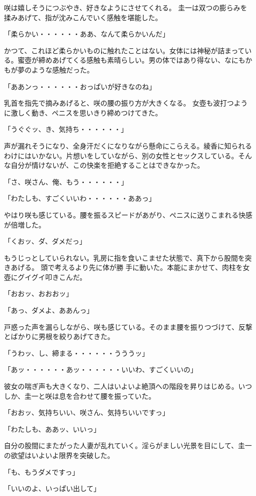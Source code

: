 ﻿\documentclass[book,tate]{jlreq}
\begin{document}
咲は嬉しそうにつぶやき、好きなようにさせてくれる。 圭一は双つの膨らみを揉みあげて、指が沈みこんでいく感触を堪能した。

「柔らかい・・・・・・ああ、なんて柔らかいんだ」

かつて、これほど柔らかいものに触れたことはない。女体には神秘が詰まっている。蜜壺が締めあげてくる感触も素晴らしい。男の体ではあり得ない、なにもかもが夢のような感触だった。

「ああンっ・・・・・・おっぱいが好きなのね」

乳首を指先で摘みあげると、咲の腰の振り方が大きくなる。 女壺も波打つように激しく動き、ペニスを思いきり締めつけてきた。

「うぐぐッ、き、気持ち・・・・・・」

声が漏れそうになり、全身汗だくになりながら懸命にこらえる。綾香に知られるわけにはいかない。片想いをしていながら、別の女性とセックスしている。そんな自分が情けないが、この快楽を拒絶することはできなかった。

「さ、咲さん、俺、もう・・・・・・」

「わたしも、すごくいいわ・・・・・・ああっ」

やはり咲も感じている。腰を振るスピードがあがり、ペニスに送りこまれる快感が倍増した。

「くおッ、ダ、ダメだっ」

もうじっとしていられない。乳房に指を食いこませた状態で、真下から股間を突きあげる。 頭で考えるより先に体が勝 手に動いた。本能にまかせて、肉柱を女壺にグイグイ叩きこんだ。

「おおッ、おおおッ」

「あっ、ダメよ、ああんっ」

戸惑った声を漏らしながら、咲も感じている。そのまま腰を振りつづけて、反撃とばかりに男根を絞りあげてきた。

「うわッ、し、締まる・・・・・・うううッ」

「あッ・・・・・・あッ・・・・・・いいわ、すごくいいの」

彼女の喘ぎ声も大きくなり、二人はいよいよ絶頂への階段を昇りはじめる。いつしか、圭一と咲は息を合わせて腰を振っていた。

「おおッ、気持ちいい、咲さん、気持ちいいですっ」

「わたしも、ああッ、いいっ」

自分の股間にまたがった人妻が乱れていく。淫らがましい光景を目にして、圭一の欲望はいよいよ限界を突破した。

「も、もうダメですっ」

「いいのよ、いっぱい出して」
\end{document}
